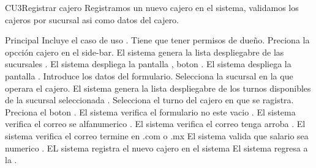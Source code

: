 \begin{UseCase}{CU3}{Registrar cajero}{
		Registramos un nuevo cajero en el sistema, validamos los cajeros por sucursal asi como datos del cajero. 	
	}
	\end{UseCase}
	\begin{UCtrayectoria}{Principal}
		\UCpaso Incluye el caso de uso .
		\UCpaso [\UCactor] Tiene que tener permisos de dueño.
		\UCpaso [\UCactor] Preciona la opcción cajero en el side-bar.
		\UCpaso El sistema genera la lista despliegabre de las sucursales .
		\UCpaso El sistema despliega la pantalla , boton  .
		\UCpaso El sistema despliega la pantalla .
		\UCpaso [\UCactor] Introduce los datos del formulario.
		\UCpaso [\UCactor] Selecciona la sucursal en la que operara el cajero.
		\UCpaso El sistema genera la lista despliegabre de los  turnos disponibles de la sucursal seleccionada .
		\UCpaso [\UCactor] Selecciona el turno del cajero en que se ragistra.
		\UCpaso [\UCactor]Preciona el boton  .
		\UCpaso El sistema verifica el formulario no este vacio .
		\UCpaso	El sistema verifica el correo se alfanumerico .
		\UCpaso El sistema verifica el correo tenga arroba .
		\UCpaso El sistema verifica el correo termine en .com o .mx 
		\UCpaso El sistema valida que salario sea numerico .%
		\UCpaso EL sistema registra el nuevo cajero en el sistema
		\UCpaso El sistema regresa a la .
		
		
	\end{UCtrayectoria}

